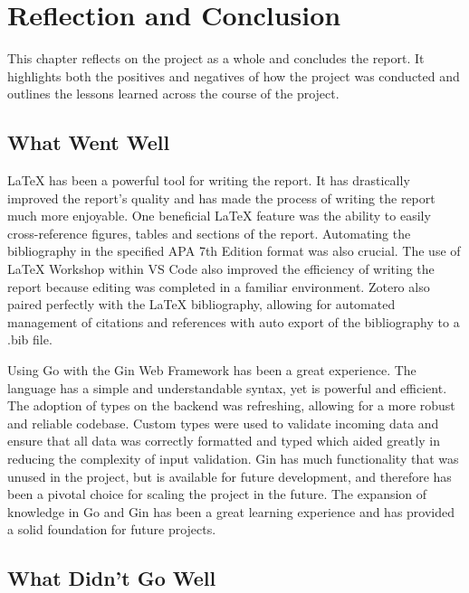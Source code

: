 \chapter{Reflection and Conclusion}
\label{chap:reflection-and-conclusion}

This chapter reflects on the project as a whole and concludes the report. It highlights both the positives and negatives of how the project was conducted and outlines the lessons learned across the course of the project.

\label{reflection-and-conclusion:what-went-well}
\section{What Went Well}

LaTeX has been a powerful tool for writing the report. It has drastically improved the report's quality and has made the process of writing the report much more enjoyable. One beneficial LaTeX feature was the ability to easily cross-reference figures, tables and sections of the report. Automating the bibliography in the specified APA 7th Edition format was also crucial. The use of LaTeX Workshop within VS Code also improved the efficiency of writing the report because editing was completed in a familiar environment. Zotero also paired perfectly with the LaTeX bibliography, allowing for automated management of citations and references with auto export of the bibliography to a .bib file.

Using Go with the Gin Web Framework has been a great experience. The language has a simple and understandable syntax, yet is powerful and efficient. The adoption of types on the backend was refreshing, allowing for a more robust and reliable codebase. Custom types were used to validate incoming data and ensure that all data was correctly formatted and typed which aided greatly in reducing the complexity of input validation. Gin has much functionality that was unused in the project, but is available for future development, and therefore has been a pivotal choice for scaling the project in the future. The expansion of knowledge in Go and Gin has been a great learning experience and has provided a solid foundation for future projects.

\label{reflection-and-conclusion:what-didnt-go-well}
\section{What Didn't Go Well}


